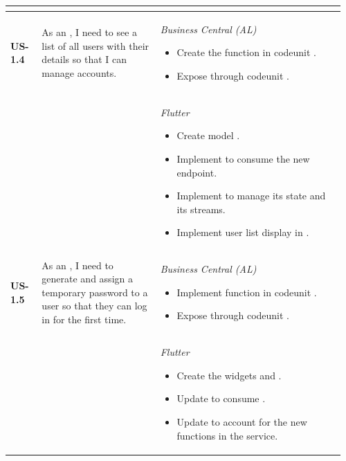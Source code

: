 \begin{longtable}{@{} P{0.09\linewidth} P{0.34\linewidth} P{0.53\linewidth} @{}}
\begin{itemize}[nosep, leftmargin=*]
	\end{itemize} \\
	\midrule
	\textbf{US-1.4}
	& As an , I need to see a list of all 
	users with their details so that I can manage accounts.
	& \noindent\textit{Business Central (AL)}
	\begin{itemize}[nosep, leftmargin=*]
		\item Create the function  in codeunit .
		\item Expose  through codeunit .
	\end{itemize}
\\ & &
	\noindent\textit{Flutter}
	\begin{itemize}[nosep, leftmargin=*]
		\item Create model .
		\item Implement  to consume the new endpoint.
		\item Implement  to manage its state and its streams.
		\item Implement user list display in .
	\end{itemize} \\
	\midrule
	\textbf{US-1.5}
	& As an , I need to generate and assign a temporary
	password to a user so that they can log in for the first time.
	& \noindent\textit{Business Central (AL)}
	\begin{itemize}[nosep, leftmargin=*]
		\item Implement function  in codeunit .
		\item Expose  through codeunit .
	\end{itemize}
\\ & &
	\noindent\textit{Flutter}
	\begin{itemize}[nosep, leftmargin=*]
		\item Create the widgets  and .
		\item Update  to consume .
		\item Update  to account for the new functions in the service.
	\end{itemize}\\

\end{longtable}
